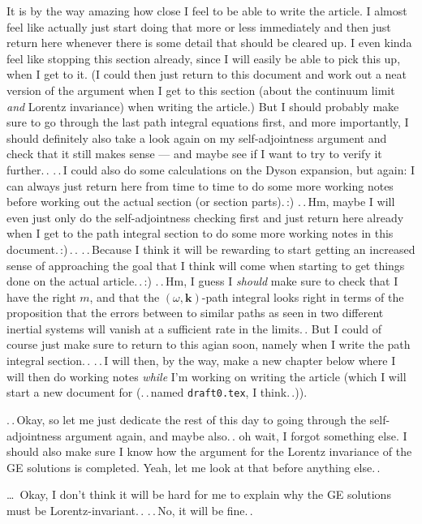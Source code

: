 \documentclass{report}
\begin{document}
It is by the way amazing how close I feel to be able to write the article. I almost feel like actually just start doing that more or less immediately and then just return here whenever there is some detail that should be cleared up. I even kinda feel like stopping this section already, since I will easily be able to pick this up, when I get to it. (I could then just return to this document and work out a neat version of the argument when I get to this section (about the continuum limit \emph{and} Lorentz invariance) when writing the article.) But I should probably make sure to go through the last path integral equations first, and more importantly, I should definitely also take a look again on my self-adjointness argument and check that it still makes sense --- and maybe see if I want to try to verify it further.\,. .\,.\,I could also do some calculations on the Dyson expansion, but again: I can always just return here from time to time to do some more working notes before working out the actual section (or section parts).\,:) .\,.\,Hm, maybe I will even just only do the self-adjointness checking first and just return here already when I get to the path integral section to do some more working notes in this document.\,:)\,.\,. .\,.\,Because I think it will be rewarding to start getting an increased sense of approaching the goal that I think will come when starting to get things done on the actual article.\,.\,:) .\,.\,Hm, I guess I \emph{should} make sure to check that I have the right $m$, and that the $(\omega, \boldsymbol{k})$-path integral looks right in terms of the proposition that the errors between to similar paths as seen in two different inertial systems will vanish at a sufficient rate in the limits.\,. But I could of course just make sure to return to this agian soon, namely when I write the path integral section.\,. .\,.\,I will then, by the way, make a new chapter below where I will then do working notes \emph{while} I'm working on writing the article (which I will start a new document for (.\,.\,named \texttt{draft0.tex}, I think.\,.)). 

.\,.\,Okay, so let me just dedicate the rest of this day to going through the self-adjointness argument again, and maybe also.\,. oh wait, I forgot something else. I should also make sure I know how the argument for the Lorentz invariance of the GE solutions is completed. Yeah, let me look at that before anything else.\,. %

\ldots\ Okay, I don't think it will be hard for me to explain why the GE solutions must be Lorentz-invariant.\,. .\,.\,No, it will be fine.\,. 
\end{document}
